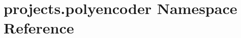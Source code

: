 \hypertarget{namespaceprojects_1_1polyencoder}{}\section{projects.\+polyencoder Namespace Reference}
\label{namespaceprojects_1_1polyencoder}
